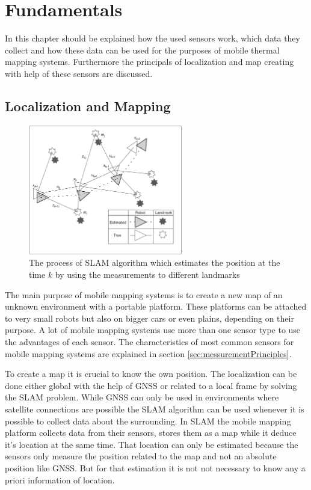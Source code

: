 \chapter{Fundamentals}\label{ch:fundamentals}
In this chapter should be explained how the used sensors work, which data they collect and how these data can be used for the purposes of mobile thermal mapping systems.
Furthermore the principals of localization and map creating with help of these sensors are discussed.

\section{Localization and Mapping}\label{sec:localizationAndMapping}

\begin{figure}
    \centering
    \includegraphics[width=0.60\textwidth]{img/fundamentals/slam.png}
    \caption{The process of SLAM algorithm which estimates the position at the time $k$ by using the measurements to different landmarks\cite{durrant-Whyte2006}}
    \label{fig:slam}
\end{figure}

The main purpose of mobile mapping systems is to create a new map of an unknown environment with a portable platform.
These platforms can be attached to very small robots but also on bigger cars or even plains, depending on their purpose.
A lot of mobile mapping systems use more than one sensor type to use the advantages of each sensor.
The characteristics of most common sensors for mobile mapping systems are explained in section \ref{sec:messurementPrinciples}.

To create a map it is crucial to know the own position.
The localization can be done either global with the help of \ac{GNSS} or related to a local frame by solving the \ac{SLAM} problem.
While \ac{GNSS} can only be used in environments where satellite connections are possible the \ac{SLAM} algorithm can be used whenever it is possible to collect data about the surrounding.
In \ac{SLAM} the mobile mapping platform collects data from their sensors, stores them as a map while it deduce it's location at the same time.
That location can only be estimated because the sensors only measure the position related to the map and not an absolute position like \ac{GNSS}.
But for that estimation it is not not necessary to know any a priori information of location\cite{durrant-Whyte2006}.

